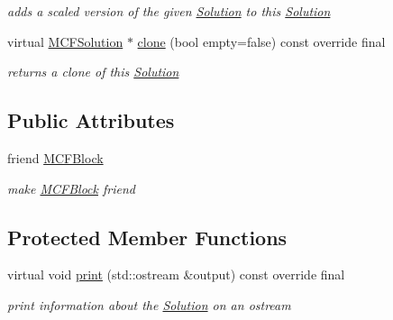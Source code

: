 \begin{DoxyCompactItemize}
\begin{DoxyCompactList}\small\item\em adds a scaled version of the given \mbox{\hyperlink{class_s_m_spp__di__unipi__it_1_1_solution}{Solution}} to this \mbox{\hyperlink{class_s_m_spp__di__unipi__it_1_1_solution}{Solution}} \end{DoxyCompactList}\item 
virtual \mbox{\hyperlink{class_s_m_spp__di__unipi__it_1_1_m_c_f_solution}{M\+C\+F\+Solution}} $\ast$ \mbox{\hyperlink{class_s_m_spp__di__unipi__it_1_1_m_c_f_solution_a0bf2bed8ce0c86fbf2a3c7a312d3462a}{clone}} (bool empty=false) const override final
\begin{DoxyCompactList}\small\item\em returns a clone of this \mbox{\hyperlink{class_s_m_spp__di__unipi__it_1_1_solution}{Solution}} \end{DoxyCompactList}\end{DoxyCompactItemize}
\subsection*{Public Attributes}
\begin{DoxyCompactItemize}
\item 
\mbox{\label{class_s_m_spp__di__unipi__it_1_1_m_c_f_solution_ab2dd801f801a2d01c2bdbc0bf5c0f6ae}} 
friend \mbox{\hyperlink{class_s_m_spp__di__unipi__it_1_1_m_c_f_solution_ab2dd801f801a2d01c2bdbc0bf5c0f6ae}{M\+C\+F\+Block}}
\begin{DoxyCompactList}\small\item\em make \mbox{\hyperlink{class_s_m_spp__di__unipi__it_1_1_m_c_f_block}{M\+C\+F\+Block}} friend \end{DoxyCompactList}\end{DoxyCompactItemize}
\subsection*{Protected Member Functions}
\begin{DoxyCompactItemize}
\item 
virtual void \mbox{\hyperlink{class_s_m_spp__di__unipi__it_1_1_m_c_f_solution_a617885c1d228e0ca67bbb0efdbe713e3}{print}} (std\+::ostream \&output) const override final
\begin{DoxyCompactList}\small\item\em print information about the \mbox{\hyperlink{class_s_m_spp__di__unipi__it_1_1_solution}{Solution}} on an ostream \end{DoxyCompactList}\end{DoxyCompactItemize}
